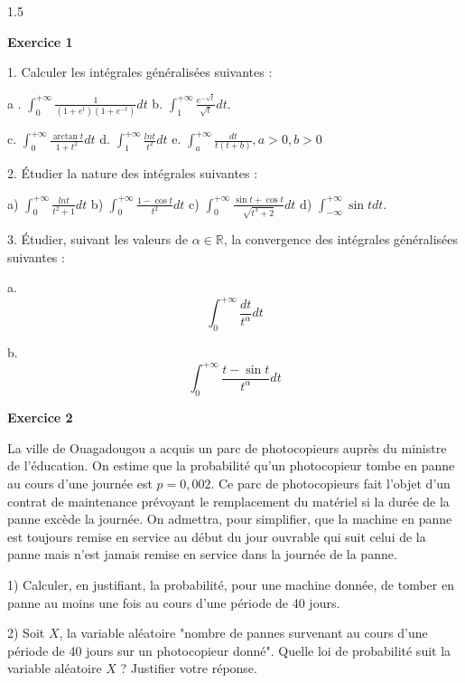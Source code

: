 \documentclass[12pt]{article}
\begin{document}
\begin{spacing}{1.5}

\textbf{Exercice 1}

1. Calculer les intégrales généralisées suivantes :

a . $\int_{0}^{+\infty}\frac{1}{(1+e^t)(1+e^{-t})}dt$ \hspace{1cm} b. $\int_{1}^{+\infty}\frac{e^{-\sqrt{t}}}{\sqrt{t}}dt$.

\medskip c. $\int_{0}^{+\infty}\frac{\arctan t}{1+t^2}dt$ \hspace{1cm}d. $\int_{1}^{+\infty}\frac{lnt}{t^2}dt$ \hspace{1cm}e. $\int_{a}^{+\infty}\frac{dt}{t(t+b)},a>0,b>0$



2. Étudier la nature des intégrales suivantes :

a) $\int_0^{+\infty}\frac{lnt}{t^2+1}dt$ \hspace{1cm}b) $\int_0^{+\infty}\frac{1-\cos t}{t^2}dt$ \hspace{1cm}c) $\int_0^{+\infty}\frac{\sin t+\cos t}{\sqrt{t^3+2}}dt$ \hspace{1cm}d) $\int_{-\infty}^{+\infty}\sin t dt$.

3. Étudier, suivant les valeurs de $\alpha\in\mathbb{R}$, la convergence des intégrales généralisées suivantes :

a. \[\int_0^{+\infty}\frac{dt}{t^{\alpha}}dt\]


b. \[\int_0^{+\infty}\frac{t-\sin t}{t^{\alpha}}dt\]


\textbf{Exercice 2}

 La ville de Ouagadougou a acquis un parc de photocopieurs auprès du ministre de l'éducation. On estime que la probabilité qu'un photocopieur tombe en panne au cours d'une journée est $p=0,002$. Ce parc de photocopieurs fait l'objet d'un contrat de maintenance prévoyant le remplacement du matériel si la durée de la panne excède la journée. On admettra, pour simplifier, que la machine en panne est toujours remise en service au début du jour ouvrable qui suit celui de la panne mais n'est jamais remise en service dans la journée de la panne.

1) Calculer, en justifiant, la probabilité, pour une machine donnée, de tomber en panne au moins une fois au cours d'une période de 40 jours.

2) Soit $X$, la variable aléatoire "nombre de pannes survenant au cours d'une période de 40 jours sur un photocopieur donné". Quelle loi de probabilité suit
 la variable aléatoire $X$ ? Justifier votre réponse.
 

\end{spacing}
\end{document}

